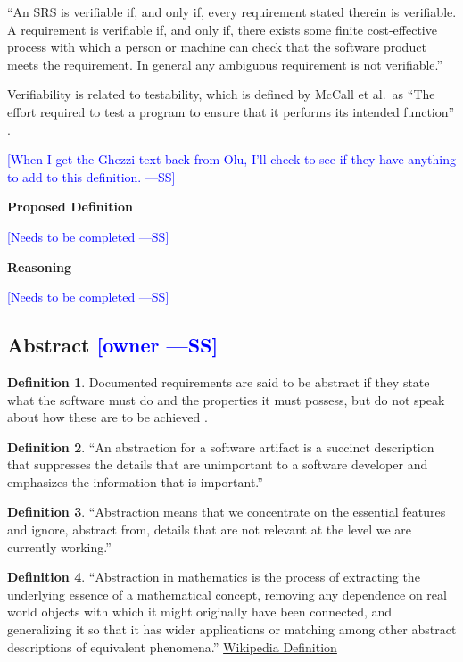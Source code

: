 \documentclass[letterpaper,cleveref]{lipics-v2019}
\newcommand{\authornote}[3]{\textcolor{#1}{[#3 ---#2]}}
\newcommand{\authornote}[3]{}
\newcommand{\wss}[1]{\authornote{blue}{SS}{#1}} %
\theoremstyle{definition}
\newtheorem{defn}{Definition}
\begin{document}
``An SRS is verifiable if, and only if, every requirement stated therein is
verifiable. A requirement is verifiable if, and only if, there exists some
finite cost-effective process with which a person or machine can check that the
software product meets the requirement. In general any ambiguous requirement is
not verifiable.'' \citep{IEEE1998}

Verifiability is related to testability, which is defined by McCall et al.\ as
``The effort required to test a program to ensure that it performs its intended
function'' \citep{VanVliet2000}.  

\wss{When I get the Ghezzi text back from Olu,
  I'll check to see if they have anything to add to this definition.}

\noindent \textbf{Proposed Definition} 

\wss{Needs to be completed}

\noindent \textbf{Reasoning}

\wss{Needs to be completed}

\subsection{Abstract \wss{owner}}

\begin{defn}
Documented requirements are said to be abstract if they state what the software
must do and the properties it must possess, but do not speak about how these are
to be achieved \citep{GhezziEtAl2003}.  
\end{defn}

\begin{defn}
``An abstraction for a software artifact is a succinct description that suppresses
the details that are unimportant to a software developer and emphasizes the
information that is important.'' \citep{Krueger1992}
\end{defn}

\begin{defn}
``Abstraction means that we concentrate on the essential features and ignore,
abstract from, details that are not relevant at the level we are currently
working.''  \citep[p.\ 296]{VanVliet2000}
\end{defn}

\begin{defn}
``Abstraction in mathematics is the process of extracting the underlying essence
of a mathematical concept, removing any dependence on real world objects with
which it might originally have been connected, and generalizing it so that it
has wider applications or matching among other abstract descriptions of
equivalent phenomena.''
\href{https://en.wikipedia.org/wiki/Abstraction_(mathematics)} {Wikipedia
  Definition}
\end{defn}
\end{document}

